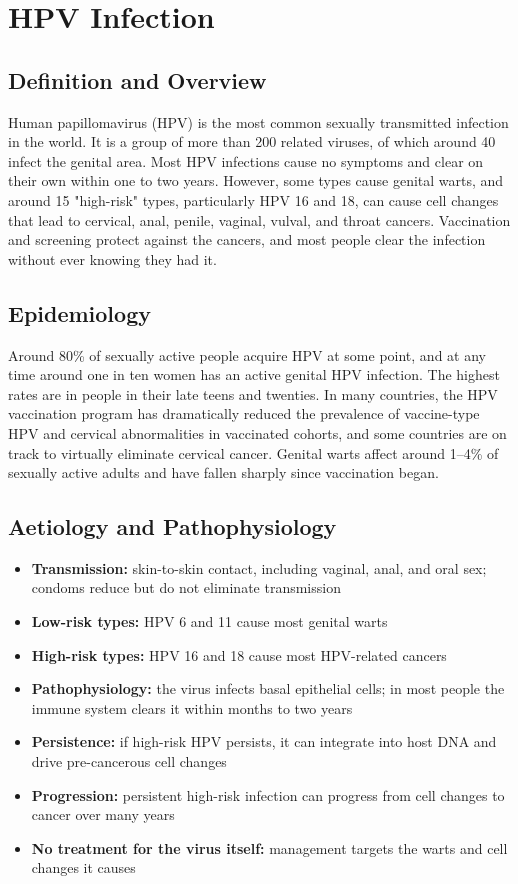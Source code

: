 \chapter{HPV Infection}

\section*{Definition and Overview}
Human papillomavirus (HPV) is the most common sexually transmitted infection in the world. It is a group of more than 200 related viruses, of which around 40 infect the genital area. Most HPV infections cause no symptoms and clear on their own within one to two years. However, some types cause genital warts, and around 15 "high-risk" types, particularly HPV 16 and 18, can cause cell changes that lead to cervical, anal, penile, vaginal, vulval, and throat cancers. Vaccination and screening protect against the cancers, and most people clear the infection without ever knowing they had it.

\section*{Epidemiology}
Around 80\% of sexually active people acquire HPV at some point, and at any time around one in ten women has an active genital HPV infection. The highest rates are in people in their late teens and twenties. In many countries, the HPV vaccination program has dramatically reduced the prevalence of vaccine-type HPV and cervical abnormalities in vaccinated cohorts, and some countries are on track to virtually eliminate cervical cancer. Genital warts affect around 1--4\% of sexually active adults and have fallen sharply since vaccination began.

\section*{Aetiology and Pathophysiology}
\begin{itemize}
    \item \textbf{Transmission:} skin-to-skin contact, including vaginal, anal, and oral sex; condoms reduce but do not eliminate transmission
    \item \textbf{Low-risk types:} HPV 6 and 11 cause most genital warts
    \item \textbf{High-risk types:} HPV 16 and 18 cause most HPV-related cancers
    \item \textbf{Pathophysiology:} the virus infects basal epithelial cells; in most people the immune system clears it within months to two years
    \item \textbf{Persistence:} if high-risk HPV persists, it can integrate into host DNA and drive pre-cancerous cell changes
    \item \textbf{Progression:} persistent high-risk infection can progress from cell changes to cancer over many years
    \item \textbf{No treatment for the virus itself:} management targets the warts and cell changes it causes
\end{itemize}

